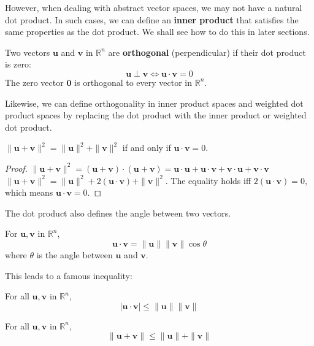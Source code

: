 However, when dealing with abstract vector spaces, we may not have a natural dot product. In such cases, we can define an \textbf{inner product} that satisfies the same properties as the dot product. We shall see how to do this in later sections.

\begin{definition}[Orthogonality]
Two vectors $\mathbf{u}$ and $\mathbf{v}$ in $\mathbb{R}^n$ are \textbf{orthogonal} (perpendicular) if their dot product is zero:
\[ \mathbf{u} \perp \mathbf{v} \iff \mathbf{u} \cdot \mathbf{v} = 0 \]
The zero vector $\mathbf{0}$ is orthogonal to every vector in $\mathbb{R}^n$.
\end{definition}

Likewise, we can define orthogonality in inner product spaces and weighted dot product spaces by replacing the dot product with the inner product or weighted dot product.

\begin{theorem}
$\|\mathbf{u} + \mathbf{v}\|^2 = \|\mathbf{u}\|^2 + \|\mathbf{v}\|^2$ if and only if $\mathbf{u} \cdot \mathbf{v} = 0$.
\end{theorem}
\begin{proof}
$\|\mathbf{u} + \mathbf{v}\|^2 = (\mathbf{u} + \mathbf{v}) \cdot (\mathbf{u} + \mathbf{v}) = \mathbf{u} \cdot \mathbf{u} + \mathbf{u} \cdot \mathbf{v} + \mathbf{v} \cdot \mathbf{u} + \mathbf{v} \cdot \mathbf{v}$
$\|\mathbf{u} + \mathbf{v}\|^2 = \|\mathbf{u}\|^2 + 2(\mathbf{u} \cdot \mathbf{v}) + \|\mathbf{v}\|^2$.
The equality holds iff $2(\mathbf{u} \cdot \mathbf{v}) = 0$, which means $\mathbf{u} \cdot \mathbf{v} = 0$.
\end{proof}

The dot product also defines the angle between two vectors.

\begin{theorem}
For $\mathbf{u}, \mathbf{v}$ in $\mathbb{R}^n$,
\[ \mathbf{u} \cdot \mathbf{v} = \|\mathbf{u}\| \|\mathbf{v}\| \cos\theta \]
where $\theta$ is the angle between $\mathbf{u}$ and $\mathbf{v}$.
\end{theorem}
This leads to a famous inequality:
\begin{theorem}
For all $\mathbf{u}, \mathbf{v}$ in $\mathbb{R}^n$,
\[ |\mathbf{u} \cdot \mathbf{v}| \le \|\mathbf{u}\| \|\mathbf{v}\| \]
\end{theorem}
\begin{theorem}
For all $\mathbf{u}, \mathbf{v}$ in $\mathbb{R}^n$,
\[ \|\mathbf{u} + \mathbf{v}\| \le \|\mathbf{u}\| + \|\mathbf{v}\| \]
\end{theorem}

